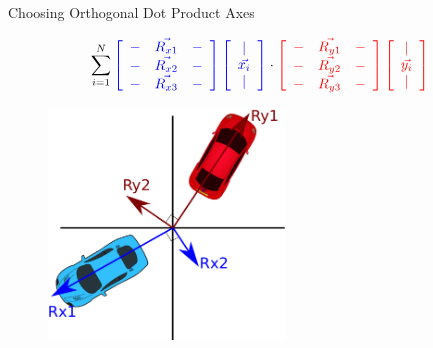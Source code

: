 \documentclass{beamer}
\begin{document}
\begin{frame}{Choosing Orthogonal Dot Product Axes}


\[ \sum_{i = 1}^N \textcolor{blue}{ \left[  \begin{array}{ccc} - & \vec{R_{x1}} & - \\ - & \vec{R_{x2}} & - \\ - & \vec{R_{x3}} & - \end{array} \right]  \left[ \begin{array}{c}  | \\ 
\vec{x_i} \\ |  \end{array} \right]  } \cdot \textcolor{red}{ \left[  \begin{array}{ccc} - & \vec{R_{y1}} & - \\ - & \vec{R_{y2}} & - \\ - & \vec{R_{y3}} & - \end{array} \right]  \left[ \begin{array}{c}  | \\ 
\vec{y_i} \\ |  \end{array} \right]   } \]

\begin{figure}[t]
	\centering
    \includegraphics[width=0.56\textwidth]{CarsRotAxes.pdf}
\end{figure}


\end{frame}
\end{document}
